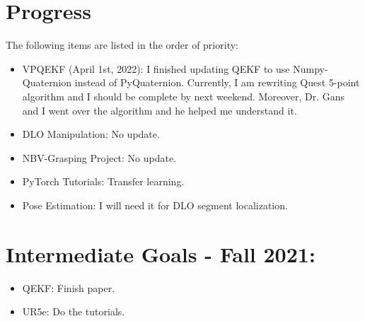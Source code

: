 \documentclass[11pt]{article}
\begin{document}
\section{Progress}
The following items are listed in the order of priority:
\begin{itemize}
      \item VPQEKF (April 1st, 2022): I finished updating QEKF to use
      Numpy-Quaternion instead of PyQuaternion.
      Currently, I am rewriting Quest 5-point algorithm and I should be complete
      by next weekend. Moreover, Dr. Gans and I went over the algorithm and he
      helped me understand it.
      \item DLO Manipulation: No update.
      \item NBV-Grasping Project: No update.
      \item PyTorch Tutorials: Transfer learning.
      \item Pose Estimation: I will need it for DLO segment localization.
\end{itemize}

\section{Intermediate Goals - Fall 2021:}
\begin{itemize}
      \item QEKF: Finish paper.
      \item UR5e: Do the tutorials.
\end{itemize}

\newpage

\newpage


\end{document}
